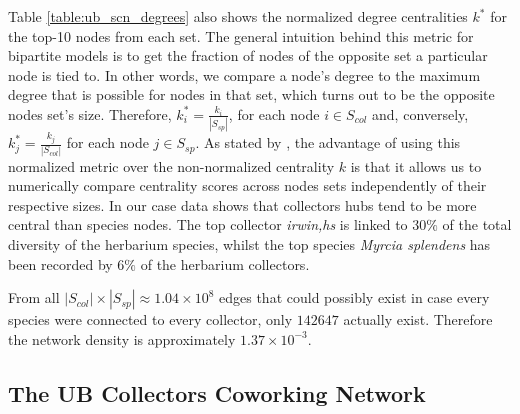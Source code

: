 Table \ref{table:ub_scn_degrees} also shows the normalized degree centralities $k^*$ for the top-10 nodes from each set. The general intuition behind this metric for bipartite models is to get the fraction of nodes of the opposite set a particular node is tied to. In other words, we compare a node's degree to the maximum degree that is possible for nodes in that set, which turns out to be the opposite nodes set's size. Therefore, $k^*_i = \frac{k_i}{|S_{sp}|}$, for each node $i \in S_{col}$ and, conversely, $k^*_j = \frac{k_j}{|S_{col}|}$ for each node $j \in S_{sp}$.  
As stated by \cite{Borgatti2015}, the advantage of using this normalized metric over the non-normalized centrality $k$ is that it allows us to numerically compare centrality scores across nodes sets independently of their respective sizes. 
In our case data shows that collectors hubs tend to be more central than species nodes. The top collector \textit{irwin,hs} is linked to $30\%$ of the total diversity of the herbarium species, whilst the top species \textit{Myrcia splendens} has been recorded by $6\%$ of the herbarium collectors. 


From all $|S_{col}| \times |S_{sp}| \approx 1.04 \times 10^{8}$ edges that could possibly exist in case every species were connected to every collector, only $142647$ actually exist. Therefore the network density is approximately $1.37 \times 10^{-3}$.

 







\subsection{The UB Collectors Coworking Network}

